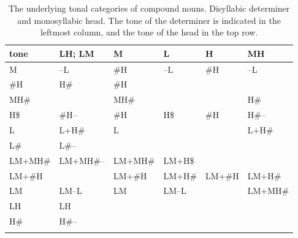 \begin{subtables}
\begin{table}%
\caption{\label{tab:abstractmonosyllabicdisyllables}The underlying tonal categories of compound
  nouns. Disyllabic determiner and monosyllabic head. The tone of the determiner is indicated in the leftmost column, and the tone of the head in the top row.}
{\renewcommand{\arraystretch}{1.35}
\begin{tabularx}{\textwidth}{ Q P{18mm} Q Q Q Q }
\lsptoprule
	tone & LH; LM & M & L & H & MH\\ \midrule
	M & --L & \#H & --L & \#H & --L\\
	\#H & H\# & \#H &  &
   \hspace*{\fill} & \hspace*{\fill}\\
	MH\# & \hspace*{\fill} & MH\# &  &  \hspace*{\fill}& H\#\\
	H\$ & \#H-- & \#H & H\$ & \#H & H\#--\\
	L & L+H\# & L &  & \hspace*{\fill} & L+H\#\\
	L\# & L\#-- &  &  &  & \hspace*{\fill}\\
	LM+MH\# & LM+MH\#-- & LM+MH\# & LM+H\$ &  & \hspace*{\fill}\\
	LM+\#H &  \hspace*{\fill}& LM+\#H & LM+H\# & LM+\#H & LM+H\#\\
	LM & LM--L & LM & LM--L &
   \hspace*{\fill} & LM+MH\#\\
	LH & LH &  &  &  & \hspace*{\fill}\\
	H\# & H\#-- &  &  &  & \hspace*{\fill}\\ 
\lspbottomrule
\end{tabularx}}
\end{table}



\end{subtables}
